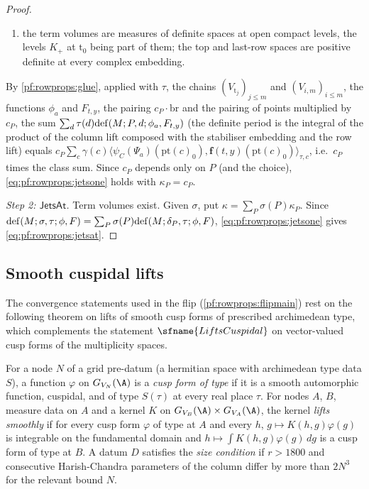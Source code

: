 \begin{proof}
\begin{enumerate}[label=(\alph*)]
\item the term volumes are measures of definite spaces at open compact levels, the levels $K_+$ at $\mathrm t_0$ being
part of them; the top and last-row spaces are positive definite at every complex embedding.
\end{enumerate}
By \cref{pf:rowprops:glue}, applied with $\tau$, the chains $(V_{\mathrm t_j})_{j\le m}$ and $(V_{i,m})_{i\le m}$, the
functions $\phi_a$ and $F_{t,y}$, the pairing $c_P\cdot\mathrm{br}$ and the pairing of points multiplied by $c_P$, the sum
$\sum_d\tau(d)\mathrm{def}(M;P,d;\phi_a,F_{t,y})$ (the definite period is the integral of the product of the column lift
composed with the stabiliser embedding and the row lift) equals $c_P\sum_c\gamma(c)\langle\psi_C(\Psi_a)(\mathrm{pt}(c)_0),
\mathbf{f}(t,y)(\mathrm{pt}(c)_0)\rangle_{\tau,c}$, i.e.\ $c_P$ times the class sum. Since $c_P$ depends only on $P$ (and
the choice), \eqref{eq:pf:rowprops:jetsone} holds with $\kappa_P=c_P$.

\emph{Step 2: $\mathsf{JetsAt}$.} Term volumes exist. Given $\sigma$, put $\kappa=\sum_P\sigma(P)\kappa_P$. Since
$\mathrm{def}(M;\sigma,\tau;\phi,F)=\sum_P\sigma(P)\mathrm{def}(M;\delta_P,\tau;\phi,F)$, \eqref{eq:pf:rowprops:jetsone} gives
\eqref{eq:pf:rowprops:jetsat}.
\end{proof}

\subsection{Smooth cuspidal lifts}\label{sec:pf:rowprops:cusp}

The convergence statements used in the flip (\cref{pf:rowprops:flipmain}) rest on the following theorem on lifts of
smooth cusp forms of prescribed archimedean type, which complements the statement $\sfname{LiftsCuspidal}$ on
vector-valued cusp forms of the multiplicity spaces.

\begin{definition}\label{def:pf:rowprops:cusptype}
For a node $N$ of a grid pre-datum (a hermitian space with archimedean type data $S$), a function $\varphi$ on
$G_{V_N}(\A)$ is a \emph{cusp form of type} if it is a smooth automorphic function, cuspidal, and of type $S(\tau)$ at every
real place $\tau$. For nodes $A$, $B$, measure data on $A$ and a kernel $K$ on $G_{V_B}(\A)\times G_{V_A}(\A)$, the kernel
\emph{lifts smoothly} if for every cusp form $\varphi$ of type at $A$ and every $h$, $g\mapsto K(h,g)\varphi(g)$ is integrable
on the fundamental domain and $h\mapsto\int K(h,g)\varphi(g)\,dg$ is a cusp form of type at $B$. A datum $D$ satisfies the
\emph{size condition} if $r>1800$ and consecutive Harish-Chandra parameters of the column differ by more than $2N^3$ for
the relevant bound $N$.
\end{definition}

